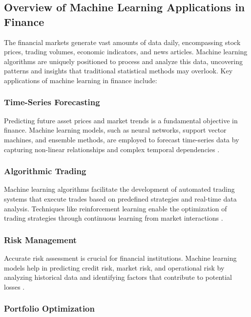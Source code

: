 \subsection{Overview of Machine Learning Applications in Finance}

The financial markets generate vast amounts of data daily, encompassing stock prices, trading volumes, economic indicators, and news articles. Machine learning algorithms are uniquely positioned to process and analyze this data, uncovering patterns and insights that traditional statistical methods may overlook. Key applications of machine learning in finance include:

\subsubsection{Time-Series Forecasting}

Predicting future asset prices and market trends is a fundamental objective in finance. Machine learning models, such as neural networks, support vector machines, and ensemble methods, are employed to forecast time-series data by capturing non-linear relationships and complex temporal dependencies \cite{sezer2020financial}.

\subsubsection{Algorithmic Trading}

Machine learning algorithms facilitate the development of automated trading systems that execute trades based on predefined strategies and real-time data analysis. Techniques like reinforcement learning enable the optimization of trading strategies through continuous learning from market interactions \cite{nevmyvaka2006reinforcement}.

\subsubsection{Risk Management}

Accurate risk assessment is crucial for financial institutions. Machine learning models help in predicting credit risk, market risk, and operational risk by analyzing historical data and identifying factors that contribute to potential losses \cite{lessmann2015benchmarking}.

\subsubsection{Portfolio Optimization}

